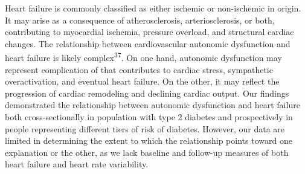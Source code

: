 \documentclass[
  a4paper,
  headsepline=true,
  open=any]{scrbook}
\begin{document}
Heart failure is commonly classified as either ischemic or non-ischemic
in origin. It may arise as a consequence of atherosclerosis,
arteriosclerosis, or both, contributing to myocardial ischemia, pressure
overload, and structural cardiac changes. The relationship between
cardiovascular autonomic dysfunction and heart failure is likely
complex\textsuperscript{37}. On one hand, autonomic dysfunction may
represent complication of that contributes to cardiac stress,
sympathetic overactivation, and eventual heart failure. On the other, it
may reflect the progression of cardiac remodeling and declining cardiac
output. Our findings demonstrated the relationship between autonomic
dysfunction and heart failure both cross-sectionally in population with
type 2 diabetes and prospectively in people representing different tiers
of risk of diabetes. However, our data are limited in determining the
extent to which the relationship points toward one explanation or the
other, as we lack baseline and follow-up measures of both heart failure
and heart rate variability.
\end{document}
